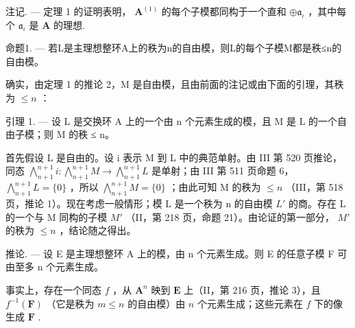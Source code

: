 注记. --- 定理 1 的证明表明， \(\mathbf{A}^{(1)}\) 的每个子模都同构于一个直和 \(\oplus \mathfrak{a}_{\iota}\) ，其中每个 \(\mathfrak{a}_{\iota}\) 是 \(\mathbf{A}\) 的理想.

命题1. --- 若L是主理想整环A上的秩为n的自由模，则L的每个子模M都是秩≤n的自由模。

确实，由定理 1 的推论 2，M 是自由模，且由前面的注记或由下面的引理，其秩为 \(\leqslant n\) ：

引理 1. --- 设 L 是交换环 A 上的一个由 n 个元素生成的模，且 M 是 L 的一个自由子模；则 M 的秩 ≤ n。

首先假设 L 是自由的。设 i 表示 M 到 L 中的典范单射。由 III 第 520 页推论，同态 \(\bigwedge_{n+1}^{n+1} i: \bigwedge_{n+1}^{n+1} M \to \bigwedge_{n+1}^{n+1} L\) 是单射；由 III 第 511 页命题 6， \(\bigwedge_{n+1}^{n+1} L = \{0\}\) ，所以 \(\bigwedge_{n+1}^{n+1} M = \{0\}\) ；由此可知 M 的秩为 \(\leqslant n\) （III，第 518 页，推论 1）。现在考虑一般情形；模 L 是一个秩为 n 的自由模 \(L'\) 的商。存在 L 的一个与 M 同构的子模 \(M'\) （II，第 218 页，命题 21）。由论证的第一部分， \(M'\) 的秩为 \(\leqslant n\) ，结论随之得出。

推论. --- 设 E 是主理想整环 A 上的模，由 n 个元素生成。则 E 的任意子模 F 可由至多 n 个元素生成。

事实上，存在一个同态 \(f\) ，从 \(\mathbf{A}^n\) 映到 \(\mathbf{E}\) 上（II，第 216 页，推论 3），且 \(f^{-1}(\mathbf{F})\) （它是秩为 \(m \leqslant n\) 的自由模）由 \(n\) 个元素生成；这些元素在 \(f\) 下的像生成 \(\mathbf{F}\) .

